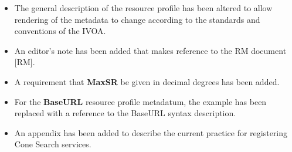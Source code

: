 \documentclass[11pt,a4paper]{ivoa}
\begin{document}
\begin{itemize}
	\item The general description of the resource
		profile has been altered to allow rendering of the metadata to change
		according to the standards and conventions of the IVOA.
	\item An	editor's note has been added that makes reference to the RM document [RM].
	\item A requirement that \textbf{MaxSR} be given in decimal
		degrees has been added. \item For the \textbf{BaseURL} resource profile
		metadatum, the example has been replaced with a reference to the BaseURL
		syntax description.
	\item An appendix has been added to describe the
		current practice for registering Cone Search services.
\end{itemize}


\end{document}
